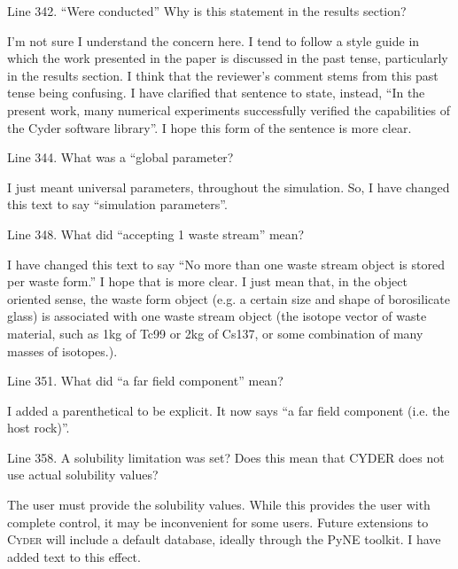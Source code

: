 \documentclass[answers,12pt]{exam}
\newcommand{\Cyder}{\textsc{Cyder}\xspace}%
\begin{document}
\begin{questions}
 

\question Line 342. “Were conducted” Why is this statement in the results section?
\begin{solution}
I'm not sure I understand the concern here. I tend to follow a style guide in 
        which the work presented in the paper is discussed in the past tense, 
        particularly in the results section. I think that the reviewer's 
        comment stems from this past tense being confusing. I have clarified 
        that sentence to state, instead, ``In the present work, many numerical 
        experiments successfully verified the capabilities of the Cyder 
        software library''. I hope this form of the sentence is more clear.
\end{solution}

 

\question Line 344. What was a “global parameter?
\begin{solution}
I just meant universal parameters, throughout the simulation. So, I have 
        changed this text to say ``simulation parameters''.
\end{solution}

 

\question Line 348. What did “accepting 1 waste stream” mean?
\begin{solution}
        I have changed this text to say ``No more than one waste stream object 
        is stored per waste form.'' I hope that is more clear. I just mean 
        that, in the object oriented sense, the waste form object (e.g. a 
        certain size and shape of borosilicate glass) is associated with one 
        waste stream object (the isotope vector of waste material, such as 1kg 
        of Tc99 or 2kg of Cs137, or some combination of many masses of 
        isotopes.).
\end{solution}

 

\question Line 351. What did “a far field component” mean?
\begin{solution}
I added a parenthetical to be explicit. It now says ``a far field component 
        (i.e. the host rock)''.
\end{solution}

 

\question Line 358. A solubility limitation was set? Does this mean that CYDER does not use actual solubility values?
\begin{solution}
The user must provide the solubility values. While this provides the user with 
        complete control, it may be inconvenient for some users. Future extensions to \Cyder will 
        include a default database, ideally through the PyNE toolkit. I have 
        added text to this effect.
\end{solution}


\end{questions}
\end{document}
